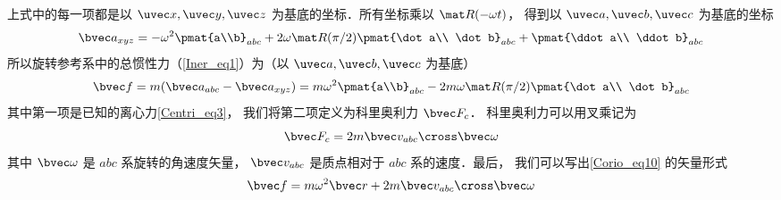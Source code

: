 上式中的每一项都是以 $\uvec x, \uvec y, \uvec z$ 为基底的坐标．所有坐标乘以 $\mat R(-\omega t)$， 得到以 $\uvec a, \uvec b, \uvec c$ 为基底的坐标
\begin{equation}
\bvec a_{xyz} =
- \omega^2 \pmat{a\\b}_{abc} + 2\omega \mat R(\pi /2)\pmat{\dot a\\ \dot b}_{abc} + \pmat{\ddot a\\ \ddot b}_{abc}
\end{equation}
所以旋转参考系中的总惯性力（\autoref{Iner_eq1}）为（以 $\uvec a, \uvec b, \uvec c$ 为基底）
\begin{equation}\label{Corio_eq10}
\bvec f = m(\bvec a_{abc} - \bvec a_{xyz})
=  m \omega ^2 \pmat{a\\b}_{abc} - 2m\omega \mat R(\pi /2)\pmat{\dot a\\ \dot b}_{abc}
\end{equation}
其中第一项是已知的离心力\autoref{Centri_eq3}， 我们将第二项定义为科里奥利力 $\bvec F_c$． 科里奥利力可以用叉乘记为
\begin{equation}
\bvec F_c = 2m \bvec v_{abc} \cross \bvec \omega
\end{equation}
其中 $\bvec\omega$ 是 $abc$ 系旋转的角速度矢量， $\bvec v_{abc}$ 是质点相对于 $abc$ 系的速度．最后， 我们可以写出\autoref{Corio_eq10} 的矢量形式
\begin{equation}
\bvec f = m \omega ^2 \bvec r + 2m \bvec v_{abc} \cross \bvec \omega 
\end{equation}
 




